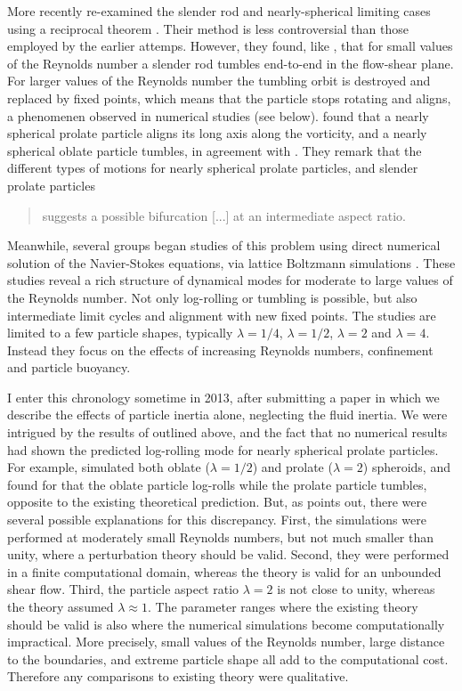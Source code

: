 \documentclass[thesis.tex]{subfiles}
\begin{document}
More recently \citet{subramanian2005,subramanian2006} re-examined the slender rod and nearly-spherical limiting cases using a reciprocal theorem \cite{kim1991,lovalenti1993}. Their method is less controversial than those employed by the earlier attemps. However, they found, like \citet{harper1968}, that for small values of the Reynolds number a slender rod tumbles end-to-end in the flow-shear plane. For larger values of the Reynolds number the tumbling orbit is destroyed and replaced by fixed points, which means that the particle stops rotating and aligns, a phenomenen observed in numerical studies \cite{ding2000} (see below). \citet{subramanian2006} found that a nearly spherical prolate particle aligns its long axis along the vorticity, and a nearly spherical oblate particle tumbles, in agreement with \citet{saffman1956}. They remark that the different types of motions for nearly spherical prolate particles, and slender prolate particles \blockquote{suggests a possible bifurcation [...] at an intermediate aspect ratio.}

Meanwhile, several groups began studies of this problem using direct numerical solution of the Navier-Stokes equations, via lattice Boltzmann simulations \cite{feng1995,ding2000,qi2003,yu2007,huang2012,rosen2014,mao2014,rosen2015a,rosen2015b}. These studies reveal a rich structure of dynamical modes for moderate to large values of the Reynolds number. Not only log-rolling or tumbling is possible, but also intermediate limit cycles and alignment with new fixed points. The studies are limited to a few particle shapes, typically $\lambda=1/4$, $\lambda=1/2$, $\lambda=2$ and $\lambda=4$. Instead they focus on the effects of increasing Reynolds numbers, confinement and particle buoyancy.

I enter this chronology sometime in 2013, after submitting a paper \cite{einarsson2014} in which we describe the effects of particle inertia alone, neglecting the fluid inertia. We were intrigued by the results of \citet{subramanian2005,subramanian2006} outlined above, and the fact that no numerical results had shown the predicted log-rolling mode for nearly spherical prolate particles. For example, \citet{qi2003} simulated both oblate ($\lambda=1/2$) and prolate ($\lambda=2$) spheroids, and found for that the oblate particle log-rolls while the prolate particle tumbles, opposite to the existing theoretical prediction. But, as \citet{subramanian2006} points out, there were several possible explanations for this discrepancy. First, the simulations were performed at moderately small Reynolds numbers, but not much smaller than unity, where a perturbation theory should be valid. Second, they were performed in a finite computational domain, whereas the theory is valid for an unbounded shear flow. Third, the particle aspect ratio $\lambda=2$ is not close to unity, whereas the theory assumed $\lambda\approx1$. The parameter ranges where the existing theory should be valid is also where the numerical simulations become computationally impractical. More precisely, small values of the Reynolds number, large distance to the boundaries, and extreme particle shape all add to the computational cost. Therefore any comparisons to existing theory were qualitative.
\end{document}
